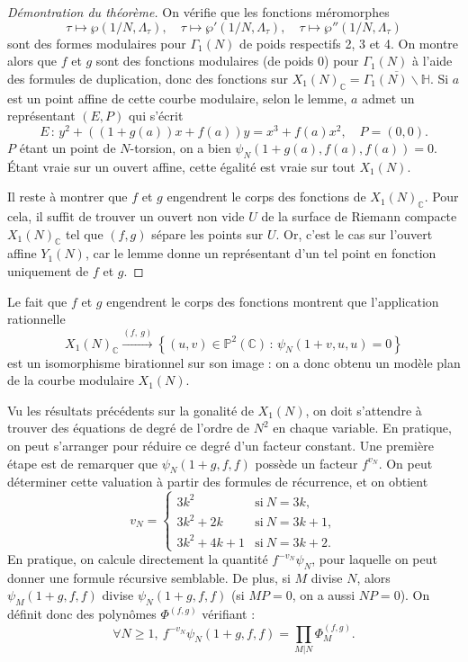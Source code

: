 \documentclass[11pt,a4paper]{article}
\newcommand{\C}{\mathbb{C}}
\renewcommand{\H}{\mathbb{H}}
\renewcommand{\P}{\mathbb{P}}
\newcommand{\vers}{\longrightarrow}
\newcommand{\de}{\,:\,}
\theoremstyle{definition}
\begin{document}
\begin{proof}[Démontration du théorème] On vérifie que les fonctions méromorphes
$$\tau\mapsto \wp(1/N, \Lambda_\tau),\quad \tau\mapsto\wp'(1/N,\Lambda_\tau),\quad \tau\mapsto\wp''(1/N, \Lambda_\tau)$$
sont des formes modulaires pour $\Gamma_1(N)$ de poids respectifs 2, 3 et 4. On montre alors que $f$ et $g$ sont des fonctions modulaires (de poids 0) pour $\Gamma_1(N)$ à l'aide des formules de duplication, donc des fonctions sur $X_1(N)_\C = \overline{\Gamma_1(N)\backslash \H}$. Si $a$ est un point affine de cette courbe modulaire, selon le lemme, $a$ admet un représentant $(E, P)$ qui s'écrit
$$E\de y^2 + ((1 + g(a))x + f(a))y = x^3 + f(a)x^2,\quad P = (0, 0).$$
$P$ étant un point de $N$-torsion, on a bien $\psi_N(1+g(a), f(a), f(a)) = 0$. \'Etant vraie sur un ouvert affine, cette égalité est vraie sur tout $X_1(N)$.

Il reste à montrer que $f$ et $g$ engendrent le corps des fonctions de $X_1(N)_\C$. Pour cela, il suffit de trouver un ouvert non vide $U$ de la surface de Riemann compacte $X_1(N)_\C$ tel que $(f, g)$ sépare les points sur $U$. Or, c'est le cas sur l'ouvert affine $Y_1(N)$, car le lemme donne un représentant d'un tel point en fonction uniquement de $f$ et $g$.
\end{proof}

Le fait que $f$ et $g$ engendrent le corps des fonctions montrent que l'application rationnelle
$$X_1(N)_\C \overset{(f,\ g)}{\vers} \left\{(u, v)\in \P^2(\C) \de \psi_N(1+v, u, u) = 0\right\}$$
est un isomorphisme birationnel sur son image : on a donc obtenu un modèle plan de la courbe modulaire $X_1(N)$.

Vu les résultats précédents sur la gonalité de $X_1(N)$, on doit s'attendre à trouver des équations de degré de l'ordre de $N^2$ en chaque variable. En pratique, on peut s'arranger pour réduire ce degré d'un facteur constant. Une première étape est de remarquer que $\psi_N(1+g, f, f)$ possède un facteur $f^{v_N}.$ On peut déterminer cette valuation à partir des formules de récurrence, et on obtient
$$ v_N =
\begin{cases}
3k^2 & \text{si}\ N = 3k, \\
3k^2 + 2k &\text{si}\ N = 3k+1, \\
3k^2 + 4k + 1 &\text{si}\ N = 3k+2.
\end{cases}$$
En pratique, on calcule directement la quantité $f^{-v_N}\psi_N$, pour laquelle on peut donner une formule récursive semblable. De plus, si $M$ divise $N$, alors $\psi_M(1+g, f, f)$ divise $\psi_N(1+g, f, f)$ (si $MP = 0$, on a aussi $NP = 0$). On définit donc des polynômes $\Phi^{(f, g)}$ vérifiant :
$$\forall N\geq 1,\ f^{-v_N} \psi_N(1+g, f, f) = \prod_{M | N} \Phi_M^{(f, g)}.$$
\end{document}
